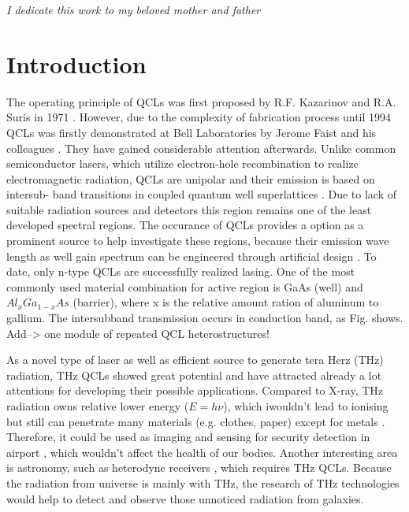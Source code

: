 \documentclass[11pt,final]{scrbook}
\begin{document}
\clearpage
\thispagestyle{empty}

\vspace*{2cm}
\begin{center}
{\normalfont\itshape  I dedicate this work to my beloved mother and father}
\end{center}

%
%
%

\chapter{Introduction}
The operating principle of QCLs was first proposed by R.F. Kazarinov and R.A. Suris in 1971 \cite{kazarinov1971possibility}. However, due to the complexity of fabrication process until 1994 QCLs was firstly demonstrated at Bell Laboratories by Jerome Faist and his colleagues \cite{faist1994quantum}. They have gained considerable attention afterwards. Unlike common semiconductor lasers, which utilize electron-hole recombination to realize electromagnetic radiation, QCLs are unipolar and their emission is based on intersub- band transitions in coupled quantum well superlattices \cite{williams2007terahertz}. Due to lack of suitable radiation sources and detectors this region remains one of the least developed spectral regions. The occurance of QCLs provides a option as a prominent source to help investigate these regions, because their emission wave length as well gain spectrum can be engineered through artificial design \cite{gmachl2002ultra}. To date, only n-type QCLs are successfully realized lasing.  One of the most commonly used material combination for active region is GaAs (well) and $Al_{x}Ga_{1-x}As$ (barrier), where x is the relative amount ration of aluminum to gallium. The intersubband transmission occurs in conduction band, as Fig. shows. Add--> one module of repeated QCL heterostructures!

As a novel type of laser as well as efficient source to generate tera Herz (THz) radiation, THz QCLs showed great potential and have attracted already a lot attentions for developing their possible applications. Compared to X-ray, THz radiation owns relative lower energy ($E=h\nu$), which iwouldn't lead to ionising but still can penetrate many materials (e.g. clothes, paper) except for metals \cite{williams2007terahertz}.  Therefore, it could be used as imaging and sensing for security detection in airport \cite{federici2005thz}, which wouldn't affect the health of our bodies. Another interesting area is astronomy, such as heterodyne receivers \cite{williams2007terahertz}, which requires THz QCLs. Because the radiation from universe is mainly with THz, the research of THz technologies would help to detect and observe those unnoticed radiation from galaxies. 
\end{document}
